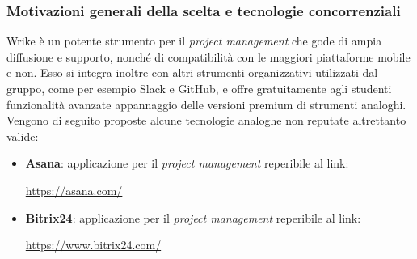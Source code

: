 \documentclass[./../Technology Baseline.tex]{subfiles}
\begin{document}
\subsubsection{Motivazioni generali della scelta e tecnologie concorrenziali}
Wrike è un potente strumento per il \textit{project management} che gode di ampia diffusione e supporto, nonché di compatibilità con le maggiori piattaforme mobile e non. Esso si integra inoltre con altri strumenti organizzativi utilizzati dal gruppo, come per esempio Slack e GitHub, e offre gratuitamente agli studenti funzionalità avanzate appannaggio delle versioni premium di strumenti analoghi. Vengono di seguito proposte alcune tecnologie analoghe non reputate altrettanto valide:
\begin{itemize}
	\item \textbf{Asana}: applicazione per il \textit{project management} reperibile al link:
	\begin{center}
		\url{https://asana.com/}
	\end{center}
	\item \textbf{Bitrix24}: applicazione per il \textit{project management} reperibile al link:
	\begin{center}
		\url{https://www.bitrix24.com/}
	\end{center} 
\end{itemize}
\end{document}
